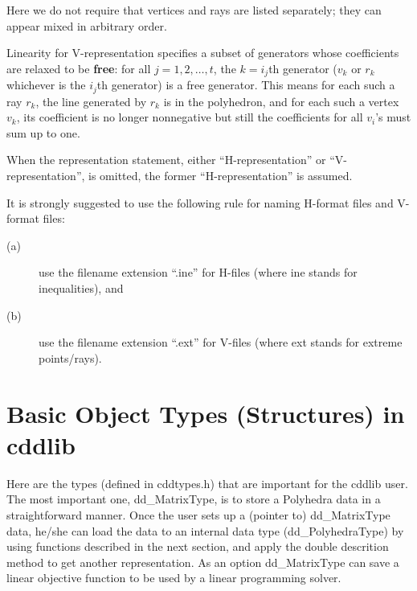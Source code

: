 \documentclass[11pt]{article}
\newcommand {\0} {{\bf 0}}
\begin{document}
\bigskip
\noindent
Here we do not require that
vertices and rays are listed
separately; they can appear mixed in arbitrary
order.

Linearity for V-representation specifies a subset of generators
whose coefficients are relaxed
to be {\bf free}:  for all $j=1,2, \ldots, t$, the $k=i_j$th generator ($v_{k}$ or $r_k$ whichever is the $i_j$th generator) is a free generator. 
This means for each such a ray $r_k$, 
the line generated by $r_k$ is in the polyhedron,
and for each such a vertex $v_k$, its coefficient is no longer nonnegative
but still the coefficients for all $v_i$'s must sum up to one. 

When the representation statement, either ``H-representation''
or ``V-representation'', is omitted, the former
``H-representation'' is assumed.

It is strongly suggested to use the following rule for naming
H-format files and V-format files:   
\begin{description}
\item[(a)] use the filename  extension ``.ine'' for H-files (where ine stands for inequalities), and 
\item[(b)]  use the filename  extension ``.ext'' for V-files (where ext stands for extreme points/rays). 
\end{description}


\section{Basic Object Types (Structures) in cddlib}  \label{DATASTR}

Here are the types (defined in cddtypes.h) that are 
important for the cddlib user.  The most important one, dd\_MatrixType,
is to store a Polyhedra data in a straightforward manner.
Once the user sets up a (pointer to) dd\_MatrixType data,
he/she can load the data to an internal data type (dd\_PolyhedraType)
by using functions described in the next section, and apply
the double descrition method to get another representation.
As an option dd\_MatrixType can save a linear objective function
to be used by a linear programming solver.
\end{document}
